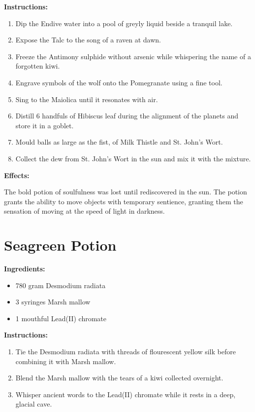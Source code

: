 \documentclass{article}
\begin{document}
\textbf{Instructions:}

\begin{enumerate}
  \item Dip the Endive water into a pool of greyly liquid beside a tranquil lake.
  \item Expose the Talc to the song of a raven at dawn.
  \item Freeze the Antimony sulphide without arsenic while whispering the name of a forgotten kiwi.
  \item Engrave symbols of the wolf onto the Pomegranate using a fine tool.
  \item Sing to the Maiolica until it resonates with air.
  \item Distill 6 handfuls of Hibiscus leaf during the alignment of the planets and store it in a goblet.
  \item Mould balls as large as the fist, of Milk Thistle and St. John's Wort.
  \item Collect the dew from St. John's Wort in the sun and mix it with the mixture.
\end{enumerate}

\textbf{Effects:}

The bold potion of soulfulness was lost until rediscovered in the sun. The potion grants the ability to move objects with temporary sentience, granting them the sensation of moving at the speed of light in darkness.

\newpage
\section*{Seagreen Potion}

\textbf{Ingredients:}

\begin{itemize}
  \item 780 gram Desmodium radiata
  \item 3 syringes Marsh mallow
  \item 1 mouthful Lead(II) chromate
\end{itemize}

\textbf{Instructions:}

\begin{enumerate}
  \item Tie the Desmodium radiata with threads of flourescent yellow silk before combining it with Marsh mallow.
  \item Blend the Marsh mallow with the tears of a kiwi collected overnight.
  \item Whisper ancient words to the Lead(II) chromate while it rests in a deep, glacial cave.
\end{enumerate}
\end{document}
